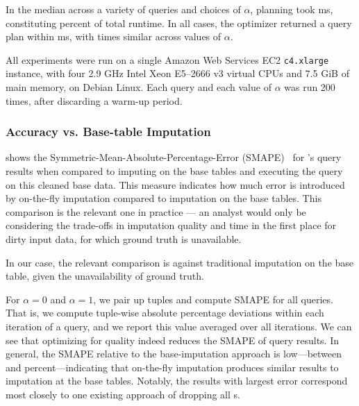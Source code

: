 
In the median across a variety of queries and choices of $\alpha$, planning took
\planningmediantime{} ms, 
constituting \planningruntimepercent{} percent of total runtime. In all cases, the optimizer
returned a query plan within \planningmaxtime{} ms, with times similar across values of $\alpha$.

All experiments were run on a single Amazon Web Services EC2 {\tt c4.xlarge} instance, with
four 2.9 GHz Intel Xeon E5--2666 v3 virtual CPUs and 7.5 GiB of main memory, on Debian Linux.
Each query and each value of $\alpha$ was run 200 times, after discarding a warm-up period.


\subsubsection{Accuracy vs. Base-table Imputation}

 shows the Symmetric-Mean-Absolute-Percentage-Error
(SMAPE)~\cite{Makridakis2000451} for \ProjectName{}'s query results when compared to
imputing on the base tables and executing the query on this cleaned base data.
This measure indicates how much error is introduced by on-the-fly imputation compared to
imputation on the base tables. This comparison is the relevant one in practice --- an
analyst would only be considering the trade-offs in imputation quality and time in the first
place for dirty input data, for which ground truth is unavailable.

In our case, the relevant comparison is against traditional
imputation on the base table, given the unavailability of ground truth.

For $\alpha=0$ and $\alpha=1$, we pair up tuples and compute SMAPE for all queries. That is,
we compute tuple-wise absolute percentage deviations within each iteration of a query, and
we report this value averaged over all iterations.  We
can see that optimizing for quality indeed reduces the SMAPE of query results.  In general, the SMAPE relative 
to the base-imputation approach is low---between \lowsmapealphazero{} and
\highsmapealphaoneexacs{} percent---indicating that on-the-fly imputation produces similar
results to imputation at the base tables. Notably, the results with largest error correspond
most closely to one existing approach of dropping all \nullv{}s.

